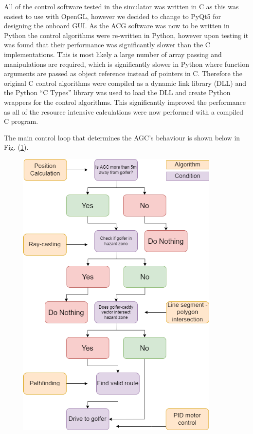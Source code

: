 \documentclass[11pt,landscape]{article}
\begin{document}
\begin{multicols}{3}
All of the control software tested in the simulator was written in C as this was
easiest to use with OpenGL, however we decided to change to PyQt5 for designing
the onboard GUI. As the ACG software was now to be written in Python the control
algorithms were re-written in Python, however upon testing it was found that
their performance was significantly slower than the C implementations. This is
most likely a large number of array passing and manipulations are required,
which is significantly slower in Python where function arguments are passed as
object reference instead of pointers in C. Therefore the original C control
algorithms were compiled as a dynamic link library (DLL) and the Python ``C
Types'' library was used to load the DLL and create Python wrappers for the
control algorithms. This significantly improved the performance as all of the
resource intensive calculations were now performed with a compiled C program.

The main control loop that determines the AGC's behaviour is shown below in Fig.
(\ref{fig:control_loop}).
\begin{figure}[H]
\begin{mdframed}
    \begin{center}
        \includegraphics[width=0.9\textwidth]{control_loop.png}
    \end{center}
\end{mdframed}
\label{fig:control_loop}
\end{figure}

\end{multicols}
\end{document}
